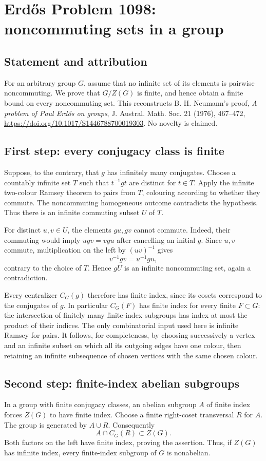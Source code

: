 \section*{Erd\H{o}s Problem 1098: noncommuting sets in a group}
\subsection*{Statement and attribution}
For an arbitrary group $G$, assume that no infinite set of its elements is pairwise noncommuting. We prove that $G/Z(G)$ is finite, and hence obtain a finite bound on every noncommuting set. This reconstructs B. H. Neumann's proof, \emph{A problem of Paul Erd\H{o}s on groups}, J. Austral. Math. Soc. 21 (1976), 467--472, \url{https://doi.org/10.1017/S1446788700019303}. No novelty is claimed.

\subsection*{First step: every conjugacy class is finite}
Suppose, to the contrary, that $g$ has infinitely many conjugates. Choose a countably infinite set $T$ such that $t^{-1}gt$ are distinct for $t\in T$. Apply the infinite two-colour Ramsey theorem to pairs from $T$, colouring according to whether they commute. The noncommuting homogeneous outcome contradicts the hypothesis. Thus there is an infinite commuting subset $U$ of $T$.

For distinct $u,v\in U$, the elements $gu,gv$ cannot commute. Indeed, their commuting would imply $ugv=vgu$ after cancelling an initial $g$. Since $u,v$ commute, multiplication on the left by $(uv)^{-1}$ gives
\[
 v^{-1}gv=u^{-1}gu,
\]
contrary to the choice of $T$. Hence $gU$ is an infinite noncommuting set, again a contradiction.

Every centralizer $C_G(g)$ therefore has finite index, since its cosets correspond to the conjugates of $g$. In particular $C_G(F)$ has finite index for every finite $F\subset G$: the intersection of finitely many finite-index subgroups has index at most the product of their indices.
The only combinatorial input used here is infinite Ramsey for pairs. It follows, for completeness, by choosing successively a vertex and an infinite subset on which all its outgoing edges have one colour, then retaining an infinite subsequence of chosen vertices with the same chosen colour.

\subsection*{Second step: finite-index abelian subgroups}
In a group with finite conjugacy classes, an abelian subgroup $A$ of finite index forces $Z(G)$ to have finite index. Choose a finite right-coset transversal $R$ for $A$. The group is generated by $A\cup R$. Consequently
\[
 A\cap C_G(R)\subset Z(G).
\]
Both factors on the left have finite index, proving the assertion. Thus, if $Z(G)$ has infinite index, every finite-index subgroup of $G$ is nonabelian.

